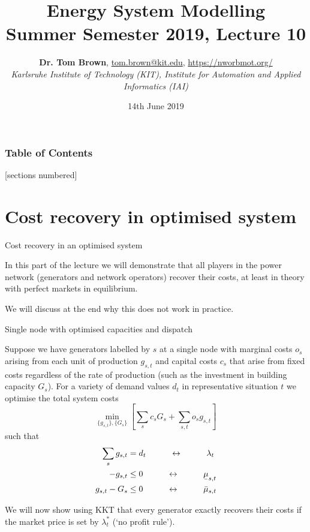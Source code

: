 \documentclass[10pt,dvipsnames]{beamer}
\title{Energy System Modelling\\ Summer Semester 2019, Lecture 10}
\author{
  {\bf Dr. Tom Brown}, \href{mailto:tom.brown@kit.edu}{tom.brown@kit.edu}, \url{https://nworbmot.org/}\\
  \emph{Karlsruhe Institute of Technology (KIT), Institute for Automation and Applied Informatics (IAI)}
}
\date{\vspace{.3cm}14th June 2019}
\def\l{\lambda}
\def\m{\mu}
\newcommand{\ubar}[1]{\text{\b{$#1$}}}
\begin{document}
\maketitle


\begin{frame}

  \frametitle{Table of Contents}
  [sections numbered]
  \tableofcontents[hideallsubsections]
\end{frame}



\section{Cost recovery in optimised system}


\begin{frame}{Cost recovery in an optimised system}

  In this part of the lecture we will demonstrate that all players in
  the power network (generators and network operators) recover their
  costs, at least in theory with perfect markets in equilibrium.

  We will discuss at the end why this does not work in practice.
\end{frame}


\begin{frame}{Single node with optimised capacities and dispatch}

  Suppose we have generators labelled by $s$ at a single node with \alert{marginal costs} $o_s$ arising from each unit of
  production $g_{s,t}$ and \alert{capital costs} $c_s$ that arise from fixed costs
  regardless of the rate of production (such as the investment in building
  capacity $G_s$).   For a variety of demand values $d_t$ in representative situation $t$ we optimise the total system costs
  \begin{equation*}
    \min_{\{g_{s,t}\},\{G_s\}}  \left[\sum_{s}c_s G_s +  \sum_{s,t} o_{s} g_{s,t} \right]
  \end{equation*}
  such that
  \begin{align*}
    \sum_s g_{s,t} & = d_t  \hspace{1cm}\leftrightarrow\hspace{1cm} \l_t \\
    - g_{s,t}  & \leq  0  \hspace{1cm}\leftrightarrow\hspace{1cm} \ubar{\m}_{s,t} \\
    g_{s,t} - G_s  & \leq 0  \hspace{1cm}\leftrightarrow\hspace{1cm} \bar{\m}_{s,t}
  \end{align*}

  We will now show using KKT that every generator exactly recovers their costs if the market price is set by $\l_t^*$ (`no profit rule').
\end{frame}
\end{document}
